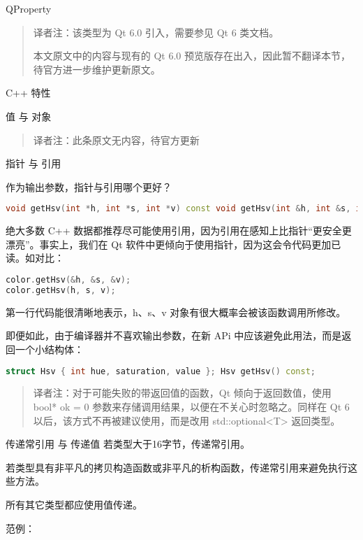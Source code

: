 QProperty

\begin{quote}
译者注：该类型为 Qt 6.0 引入，需要参见 Qt 6 类文档。

本文原文中的内容与现有的 Qt 6.0 预览版存在出入，因此暂不翻译本节，待官方进一步维护更新原文。
\end{quote}

C++ 特性

值 与 对象

\begin{quote}
译者注：此条原文无内容，待官方更新
\end{quote}

指针 与 引用

作为输出参数，指针与引用哪个更好？

\begin{lstlisting}[language=C++]
void getHsv(int *h, int *s, int *v) const void getHsv(int &h, int &s, int &v) const
\end{lstlisting}

绝大多数 C++ 数据都推荐尽可能使用引用，因为引用在感知上比指针“更安全更漂亮”。事实上，我们在 Qt 软件中更倾向于使用指针，因为这会令代码更加已读。如对比：

\begin{lstlisting}[language=C++]
color.getHsv(&h, &s, &v);
color.getHsv(h, s, v);
\end{lstlisting}

第一行代码能很清晰地表示，h、s、v 对象有很大概率会被该函数调用所修改。

即便如此，由于编译器并不喜欢输出参数，在新 APi 中应该避免此用法，而是返回一个小结构体：

\begin{lstlisting}[language=C++]
struct Hsv { int hue, saturation, value }; Hsv getHsv() const;
\end{lstlisting}

\begin{quote}
	译者注：对于可能失败的带返回值的函数，Qt 倾向于返回数值，使用 bool* ok = 0 参数来存储调用结果，以便在不关心时忽略之。同样在 Qt 6 以后，该方式不再被建议使用，而是改用 std::optional<T> 返回类型。
\end{quote}

传递常引用 与 传递值
若类型大于16字节，传递常引用。

若类型具有非平凡的拷贝构造函数或非平凡的析构函数，传递常引用来避免执行这些方法。

所有其它类型都应使用值传递。

范例：

